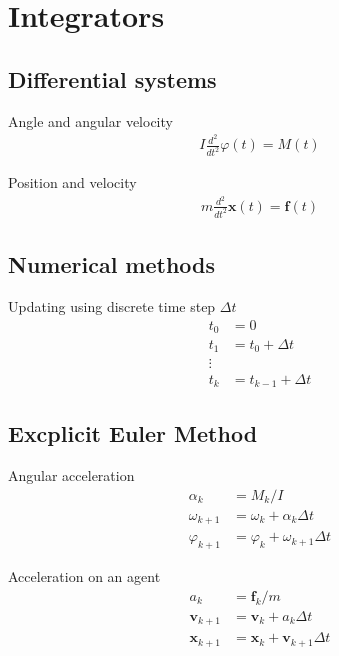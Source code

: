 \section{Integrators}
\subsection{Differential systems}
Angle and angular velocity
\begin{align}
I \frac{d^{2}}{d t^{2}} \varphi(t) = M(t)
\end{align}

Position and velocity
\begin{align}
m \frac{d^{2}}{d t^{2}} \mathbf{x}(t) = \mathbf{f}(t)
\end{align}

\subsection{Numerical methods}
Updating using discrete time step $ \Delta t $
\begin{align}
t_{0} &= 0 \\
t_{1} &= t_{0} + \Delta t \\
\vdots \\
t_{k} &= t_{k-1} + \Delta t
\end{align}


\subsection{Excplicit Euler Method}
Angular acceleration
\begin{align}
\alpha_{k} &= M_{k} / I \\
\omega_{k+1} &= \omega_{k} + \alpha_{k} \Delta t \\
\varphi_{k+1} &= \varphi_{k} + \omega_{k+1} \Delta t
\end{align}

Acceleration on an agent
\begin{align}
a_{k} &= \mathbf{f}_{k} / m \\
\mathbf{v}_{k+1} &= \mathbf{v}_{k} + a_{k} \Delta t \\
\mathbf{x}_{k+1} &= \mathbf{x}_{k} + \mathbf{v}_{k+1} \Delta t
\end{align}


